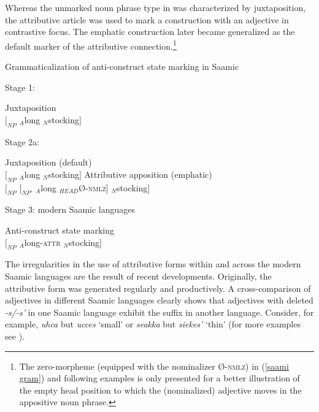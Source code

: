 {Whereas the unmarked noun phrase type in  was characterized by juxtaposition, the attributive article was used to mark a construction with an adjective in contrastive focus. The emphatic construction later became generalized as the default marker of the attributive connection.\footnote{The zero-morpheme (equipped with the nominalizer Ø-\textsc{nmlz}) in (\ref{saami gram}) and following examples is only presented for a better illustration of the empty head position to which the (nominalized) adjective moves in the appositive noun phrase.}
\begin{exe}
\label{saami gram}
\ex \rm{Grammaticalization of anti-construct state marking in Saamic} 
\begin{xlist}
\ex \rm{Stage 1: }
\begin{xlist}
\ex \rm{Juxtaposition}\\
	$[_{NP}$ $_{A}$long $_{N}$stocking$]$
\end{xlist}
\ex \rm{Stage 2a: }
\begin{xlist}
\ex \rm{Juxtaposition (default)}\\
	$[_{NP}$ $_{A}$long $_{N}$stocking$]$
\ex \rm{Attributive apposition (emphatic)}\\
	$[_{NP}$ $[_{NP'}$ $_{A}$long $_{HEAD}$Ø-\textsc{nmlz}$]$ $_{N}$stocking$]$
\end{xlist}
\ex \rm{Stage 3: modern Saamic languages}
\begin{xlist}
\ex \rm{Anti-construct state marking}\\
	$[_{NP}$ $_{A}$long-\textsc{attr} $_{N}$stocking$]$
\end{xlist}
\end{xlist}
\end{exe}
The irregularities in the use of attributive forms within and across the modern Saamic languages are the result of recent developments. Originally, the attributive form was generated regularly and productively. A cross-comparison of adjectives in different Saamic languages clearly shows that adjectives with deleted \textit{-s/-s'} in one Saamic language exhibit the suffix in another language. Consider, for example,  \textit{uhca} but  \textit{ucces} ‘small’ or  \textit{seakka} but  \textit{sie{\ng}{\ng}kes'} ‘thin’ (for more examples see \citealt{riesler2006b}).

}
